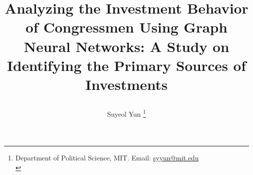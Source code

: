 \documentclass[15pt,letterpaper]{article}
\newcommand{\tit}{
\Large \bf
Analyzing the Investment Behavior of Congressmen Using Graph Neural Networks: A Study on Identifying the Primary Sources of Investments
}
\newcommand\spacingset[1]{\renewcommand{\baselinestretch}
{#1}\small\normalsize}
\begin{document}
\spacingset{1.25}

\setcounter{page}{0}
\vspace{-.1in}

{\title{
    \tit
  }
  \author{
    Suyeol Yun
  \thanks{Department of Political Science, MIT. Email: \href{mailto:syyun@mit.edu}{syyun@mit.edu}\\
  }
  }
  \maketitle
}

\thispagestyle{empty}
\vspace{-.1in}


\end{document}
